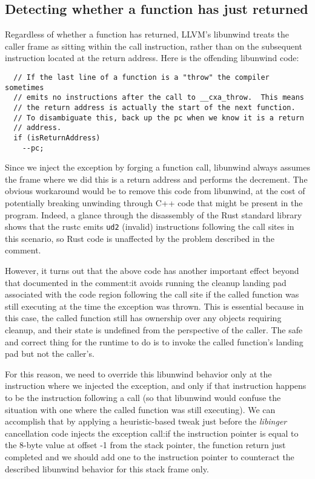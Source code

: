 \subsection{Detecting whether a function has just returned}
\label{sec:ingerc:return}

Regardless of whether a function has returned, LLVM's libunwind treats the caller
frame as sitting within the call instruction, rather than on the subsequent
instruction located at the return address.  Here is the offending libunwind code:
\begin{lstlisting}
  // If the last line of a function is a "throw" the compiler sometimes
  // emits no instructions after the call to __cxa_throw.  This means
  // the return address is actually the start of the next function.
  // To disambiguate this, back up the pc when we know it is a return
  // address.
  if (isReturnAddress)
  	--pc;
\end{lstlisting}

Since we inject the exception by forging a function call, libunwind always assumes
the frame where we did this is a return address and performs the decrement.  The
obvious workaround would be to remove this code from libunwind, at the cost of
potentially breaking unwinding through C++ code that might be present in the program.
Indeed, a glance through the disassembly of the Rust standard library shows that the
rustc emits \texttt{ud2} (invalid) instructions following the call sites in this
scenario, so Rust code is unaffected by the problem described in the comment.

However, it turns out that the above code has another important effect beyond that
documented in the comment:\@ it avoids running the cleanup landing pad associated
with the code region following the call site if the called function was still
executing at the time the exception was thrown.  This is essential because in this
case, the called function still has ownership over any objects requiring cleanup, and
their state is undefined from the perspective of the caller.  The safe and correct
thing for the runtime to do is to invoke the called function's landing pad but not
the caller's.

For this reason, we need to override this libunwind behavior only at the instruction
where we injected the exception, and only if that instruction happens to be the
instruction following a call (so that libunwind would confuse the situation with one
where the called function was still executing).  We can accomplish that by applying
a heuristic-based tweak just before the \textit{libinger} cancellation code injects
the exception call:\@ if the instruction pointer is equal to the 8-byte value at
offset -1 from the stack pointer, the function return just completed and we should
add one to the instruction pointer to counteract the described libunwind behavior for
this stack frame only.


